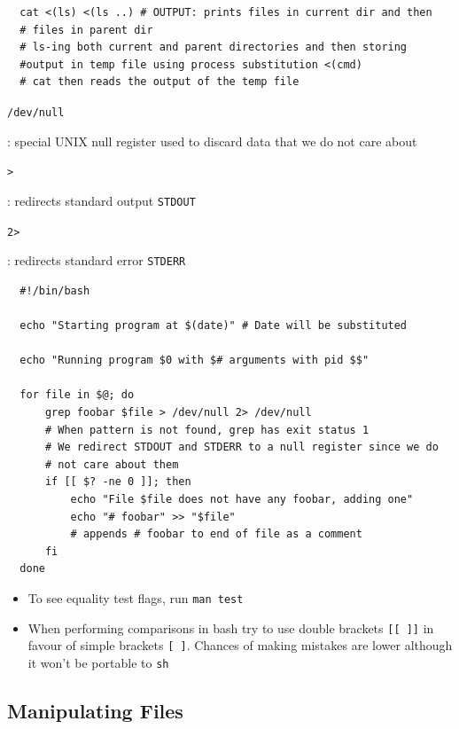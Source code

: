 \documentclass[letterpaper,12pt]{article}
\newcommand*{\lstitem}[1]{
  \setbox0\hbox{\lstinline{#1}}
  \item[\usebox0]
}
\begin{document}
\begin{lstlisting}
  cat <(ls) <(ls ..) # OUTPUT: prints files in current dir and then
  # files in parent dir
  # ls-ing both current and parent directories and then storing
  #output in temp file using process substitution <(cmd)
  # cat then reads the output of the temp file
\end{lstlisting}

\begin{description}
 \lstitem{/dev/null}: special UNIX null register used to discard data that we do not care about
 \lstitem{>}: redirects standard output \lstinline{STDOUT}
 \lstitem{2>}: redirects standard error \lstinline{STDERR}
\end{description}

\begin{lstlisting}
  #!/bin/bash

  echo "Starting program at $(date)" # Date will be substituted

  echo "Running program $0 with $# arguments with pid $$"

  for file in $@; do
      grep foobar $file > /dev/null 2> /dev/null
      # When pattern is not found, grep has exit status 1
      # We redirect STDOUT and STDERR to a null register since we do
      # not care about them
      if [[ $? -ne 0 ]]; then
          echo "File $file does not have any foobar, adding one"
          echo "# foobar" >> "$file"
          # appends # foobar to end of file as a comment
      fi
  done
\end{lstlisting}

\begin{itemize}
 \item To see equality test flags, run \lstinline{man test}
 \item When performing comparisons in bash try to use double brackets \lstinline{[[ ]]} in favour of simple brackets \lstinline{[ ]}. Chances of making mistakes are lower although it won’t be portable to \lstinline{sh}
\end{itemize}

\subsection{Manipulating Files}
\end{document}
